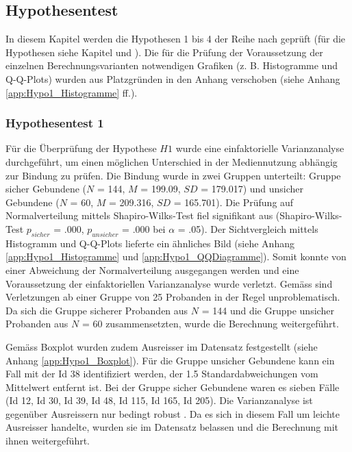\subsection{Hypothesentest} \label{sec:Hypothesentest}
In diesem Kapitel werden die Hypothesen 1 bis 4 der Reihe nach geprüft (für die Hypothesen siehe Kapitel \textit{} und \textit{}). Die für die Prüfung der Voraussetzung der einzelnen Berechnungsvarianten notwendigen Grafiken (z. B. Histogramme und Q-Q-Plots) wurden aus Platzgründen in den Anhang verschoben (siehe Anhang \ref{app:Hypo1_Histogramme} ff.).

\subsubsection{Hypothesentest 1}\label{sec:Hypothesentest1}
Für die Überprüfung der Hypothese $H1$ wurde eine einfaktorielle Varianzanalyse durchgeführt, um einen möglichen Unterschied in der Mediennutzung abhängig zur Bindung zu prüfen. Die Bindung wurde in zwei Gruppen unterteilt: Gruppe sicher Gebundene ($N$ = 144, $M$ = 199.09, $SD$ = 179.017) und unsicher Gebundene ($N$ = 60, $M$ = 209.316, $SD$ = 165.701). Die Prüfung auf Normalverteilung mittels Shapiro-Wilks-Test \cite{Shapiro1965} fiel signifikant aus (Shapiro-Wilks-Test $p_{sicher}$ = .000, $p_{unsicher}$ = .000 bei $\alpha$ = .05). Der Sichtvergleich mittels Histogramm und Q-Q-Plots lieferte ein ähnliches Bild (siehe Anhang \ref{app:Hypo1_Histogramme} und \ref{app:Hypo1_QQDiagramme}). Somit konnte von einer Abweichung der Normalverteilung ausgegangen werden \cite{Hemmerich2018} und eine Voraussetzung der einfaktoriellen Varianzanalyse wurde verletzt. Gemäss  sind Verletzungen ab einer Gruppe von 25 Probanden in der Regel unproblematisch. Da sich die Gruppe sicherer Probanden aus $N$ = 144 und die Gruppe unsicher Probanden aus $N$ = 60 zusammensetzten, wurde die Berechnung weitergeführt.

Gemäss Boxplot wurden zudem Ausreisser im Datensatz festgestellt (siehe Anhang \ref{app:Hypo1_Boxplot}). Für die Gruppe unsicher Gebundene kann ein Fall mit der Id 38 identifiziert werden, der 1.5 Standardabweichungen vom Mittelwert entfernt ist. Bei der Gruppe sicher Gebundene waren es sieben Fälle (Id 12, Id 30, Id 39, Id 48, Id 115, Id 165, Id 205). Die Varianzanalyse ist gegenüber Ausreissern nur bedingt robust \cite{Hemmerich2018}. Da es sich in diesem Fall um leichte Ausreisser handelte, wurden sie im Datensatz belassen und die Berechnung mit ihnen weitergeführt.  

